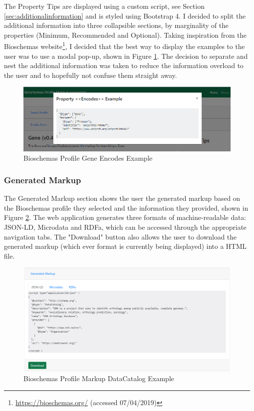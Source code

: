 {
\newpage
The Property Tips are displayed using a custom script, see Section \ref{sec:additionalinformation} and is styled using Bootstrap 4. I decided to split the additional information into three collapsible sections, by marginality of the properties (Minimum, Recommended and Optional). Taking inspiration from the Bioschemas website\footnote{\url{https://bioschemas.org/} (accessed 07/04/2019)}, I decided that the best way to display the examples to the user was to use a modal pop-up, shown in Figure \ref{fig:geneEncodesExample}. The decision to separate and nest the additional information was taken to reduce the information overload to the user and to hopefully not confuse them straight away.\newline

\begin{figure}[!h]
 \centering\includegraphics[scale=0.42]{images/system/propertyExample.PNG}
   \caption{Bioschemas Profile Gene Encodes Example}
   \label{fig:geneEncodesExample}
\end{figure}

\subsubsection*{Generated Markup}
The Generated Markup section shows the user the generated markup based on the Bioschemas profile they selected and the information they provided, shown in Figure \ref{fig:generatedMarkup}. The web application generates three formats of machine-readable data: JSON-LD, Microdata and RDFa, which can be accessed through the appropriate navigation tabs. The "Download" button also allows the user to download the generated markup (which ever format is currently being displayed) into a HTML file.\newline

\begin{figure}[!h]
 \centering\includegraphics[scale=0.38]{images/system/GeneratedData.PNG}
   \caption{Bioschemas Profile Markup DataCatalog Example}
   \label{fig:generatedMarkup}
\end{figure}

}

